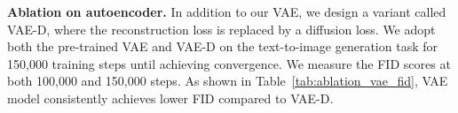 \begin{table}[h!]
\centering
\renewcommand{\arraystretch}{1.5} 
\setlength{\tabcolsep}{15pt} 
\caption{FID scores for different text encoders. The ``last layer'' and ``second last layer'' refer to the text features extracted from the last and second last layers of the encoder, respectively.}
\label{tab:ablation_textenc_fid}
\end{table}


\textbf{Ablation on autoencoder.} In addition to our VAE, we design a variant called VAE-D, where the reconstruction loss is replaced by a diffusion loss. We adopt both the pre-trained VAE and VAE-D on the text-to-image generation task for 150,000 training steps until achieving convergence. We measure the FID scores at both 100,000 and 150,000 steps. As shown in Table~\ref{tab:ablation_vae_fid}, VAE model consistently achieves lower FID compared to VAE-D.
